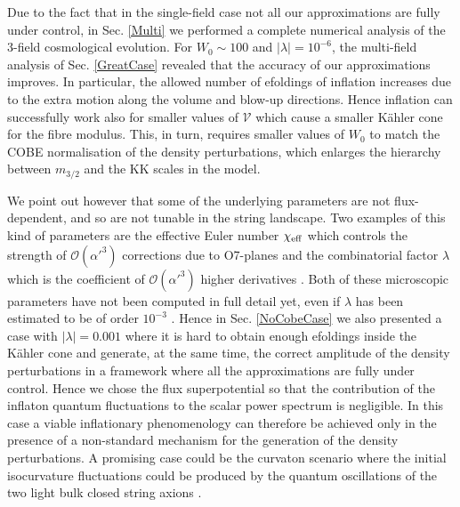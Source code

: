 \documentclass[11pt,a4paper]{article}
\newcommand\vo{{\mathcal{V}}}
\newcommand{\mc}{\mathcal}
\begin{document}
Due to the fact that in the single-field case not all our approximations are fully under control, in Sec. \ref{Multi} we performed a complete numerical analysis of the $3$-field cosmological evolution. For $W_0\sim 100$ and $|\lambda|=10^{-6}$, the multi-field analysis of Sec. \ref{GreatCase} revealed that the accuracy of our approximations improves. In particular, the allowed number of efoldings of inflation increases due to the extra motion along the volume and blow-up directions. Hence inflation can successfully work also for smaller values of $\vo$ which cause a smaller K\"ahler cone for the fibre modulus. This, in turn, requires smaller values of $W_0$ to match the COBE normalisation of the density perturbations, which enlarges the hierarchy between $m_{3/2}$ and the KK scales in the model. 

We point out however that some of the underlying parameters are not flux-dependent, and so are not tunable in the string landscape. Two examples of this kind of parameters are the effective Euler number $\chi_{\rm eff}$ which controls the strength of $\mc{O}(\alpha'^3)$ corrections due to O7-planes \cite{Minasian:2015bxa} and the combinatorial factor $\lambda$ which is the coefficient of $\mc{O}(\alpha'^3)$ higher derivatives \cite{Ciupke:2015msa}. Both of these microscopic parameters have not been computed in full detail yet, even if $\lambda$ has been estimated to be of order $10^{-3}$ \cite{Grimm:2017okk}. Hence in Sec. \ref{NoCobeCase} we also presented a case with $|\lambda|=0.001$ where it is hard to obtain enough efoldings inside the K\"ahler cone and generate, at the same time, the correct amplitude of the density perturbations in a framework where all the approximations are fully under control. Hence we chose the flux superpotential so that the contribution of the inflaton quantum fluctuations to the scalar power spectrum is negligible. In this case a viable inflationary phenomenology can therefore be achieved only in the presence of a non-standard mechanism for the generation of the density perturbations. A promising case could be the curvaton scenario where the initial isocurvature fluctuations could be produced by the quantum oscillations of the two light bulk closed string axions \cite{curvaton}. 
\end{document}
